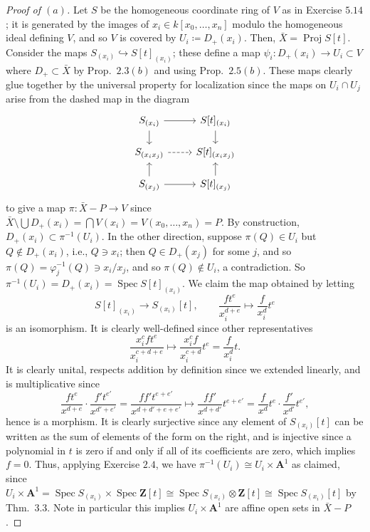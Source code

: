 \documentclass[10pt]{article}
\theoremstyle{definition}
\theoremstyle{remark}
\numberwithin{equation}{section}
\numberwithin{figure}{subsubsection}
\DeclareMathOperator{\Spec}{Spec}
\DeclareMathOperator{\Proj}{Proj}
\begin{document}
\begin{proof}[Proof of $(a)$]
  Let $S$ be the homogeneous coordinate ring of $V$ as in Exercise $5.14$; it is generated by the images of $x_i \in k[x_0,\ldots,x_n]$ modulo the homogeneous ideal defining $V$, and so $V$ is covered by $U_i \coloneqq D_+(x_i)$. Then, $\bar{X} = \Proj S[t]$. Consider the maps $S_{(x_i)} \hookrightarrow S[t]_{(x_i)}$; these define a map $\psi_i \colon D_+(x_i) \to U_i \subset V$ where $D_+ \subset \bar{X}$ by Prop.~$2.3(b)$ and using Prop.~$2.5(b)$. These maps clearly glue together by the universal property for localization \cite[Prop.~3.1]{AM69} since the maps on $U_i \cap U_j$ arise from the dashed map in the diagram
  \begin{equation*}
    \begin{tikzcd}[row sep=scriptsize]
      S_{(x_i)} \rar\dar & S[t]_{(x_i)}\dar\\
      S_{(x_ix_j)}\rar[dashed] & S[t]_{(x_ix_j)}\\
      S_{(x_j)} \rar\uar & S[t]_{(x_j)}\uar
    \end{tikzcd}
  \end{equation*}
  to give a map $\pi\colon\bar{X} - P \to V$ since $\bar{X} \setminus \bigcup D_+(x_i) = \bigcap V(x_i) = V(x_0,\ldots,x_n) = P$. By construction, $D_+(x_i) \subset \pi^{-1}(U_i)$. In the other direction, suppose $\pi(Q) \in U_i$ but $Q \notin D_+(x_i)$, i.e., $Q \ni x_i$; then $Q \in D_+(x_j)$ for some $j$, and so $\pi(Q) = \varphi_j^{-1}(Q) \ni x_i/x_j$, and so $\pi(Q) \notin U_i$, a contradiction. So $\pi^{-1}(U_i) = D_+(x_i) = \Spec S[t]_{(x_i)}$. We claim the map obtained by letting
  \begin{equation*}
    S[t]_{(x_i)} \to S_{(x_i)}[t], \qquad \frac{ft^e}{x_i^{d+e}} \mapsto \frac{f}{x_i^d} t^e
  \end{equation*}
  is an isomorphism. It is clearly well-defined since other representatives
  \begin{equation*}
    \frac{x_i^cft^e}{x_i^{c+d+e}} \mapsto \frac{x_i^cf}{x_i^{c+d}} t^e = \frac{f}{x_i^d} t.
  \end{equation*}
  It is clearly unital, respects addition by definition since we extended linearly, and is multiplicative since
  \begin{equation*}
    \frac{ft^e}{x^{d+e}} \cdot \frac{f't^{e'}}{x^{d'+e'}} = \frac{ff't^{e+e'}}{x^{d+d'+e+e'}} \mapsto \frac{ff'}{x^{d+d'}}t^{e+e'} = \frac{f}{x^d}t^e \cdot \frac{f'}{x^{d'}}t^{e'},
  \end{equation*}
  hence is a morphism. It is clearly surjective since any element of $S_{(x_i)}[t]$ can be written as the sum of elements of the form on the right, and is injective since a polynomial in $t$ is zero if and only if all of its coefficients are zero, which implies $f=0$. Thus, applying Exercise $2.4$, we have $\pi^{-1}(U_i) \cong U_i \times \mathbf{A}^1$ as claimed, since $U_i \times \mathbf{A}^1 = \Spec S_{(x_i)} \times \Spec \mathbf{Z}[t] \cong \Spec S_{(x_i)} \otimes \mathbf{Z}[t] \cong \Spec S_{(x_i)}[t]$ by Thm.~3.3. Note in particular this implies $U_i \times \mathbf{A}^1$ are affine open sets in $\bar{X} - P$.

\end{proof}
\end{document}
